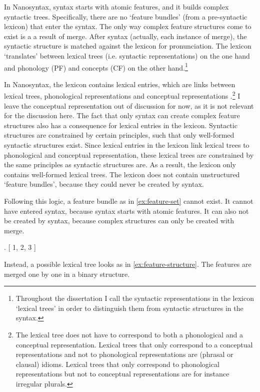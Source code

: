 In Nanosyntax, syntax starts with atomic features, and it builds complex syntactic trees. Specifically, there are no `feature bundles' (from a pre-syntactic lexicon) that enter the syntax. The only way complex feature structures come to exist is a a result of merge.
After syntax (actually, each instance of merge), the syntactic structure is matched against the lexicon for pronunciation. The lexicon `translates' between lexical trees (i.e. syntactic representations) on the one hand and phonology (PF) and concepts (CF) on the other hand.\footnote{
Throughout the dissertation I call the syntactic representations in the lexicon `lexical trees' in order to distinguish them from syntactic structures in the syntax.
}

In Nanosyntax, the lexicon contains lexical entries, which are links between lexical trees, phonological representations and conceptual representations \citep{starke2014}.\footnote{
The lexical tree does not have to correspond to both a phonological and a conceptual representation. Lexical trees that only correspond to a conceptual representations and not to phonological representations are (phrasal or clausal) idioms. Lexical trees that only correspond to phonological representations but not to conceptual representations are for instance irregular plurals.
} I leave the conceptual representation out of discussion for now, as it is not relevant for the discussion here. The fact that only syntax can create complex feature structures also has a consequence for lexical entries in the lexicon.
Syntactic structures are constrained by certain principles, such that only well-formed syntactic structures exist. Since lexical entries in the lexicon link lexical trees to phonological and conceptual representation, these lexical trees are constrained by the same principles as syntactic structures are.
As a result, the lexicon only contains well-formed lexical trees. The lexicon does not contain unstructured `feature bundles', because they could never be created by syntax.

Following this logic, a feature bundle as in \ref{ex:feature-set} cannot exist. It cannot have entered syntax, because syntax starts with atomic features. It can also not be created by syntax, because complex structures can only be created with merge.

\ex. [ 1, 2, 3 ]\label{ex:feature-set}

Instead, a possible lexical tree looks as in \ref{ex:feature-structure}. The features are merged one by one in a binary structure.

